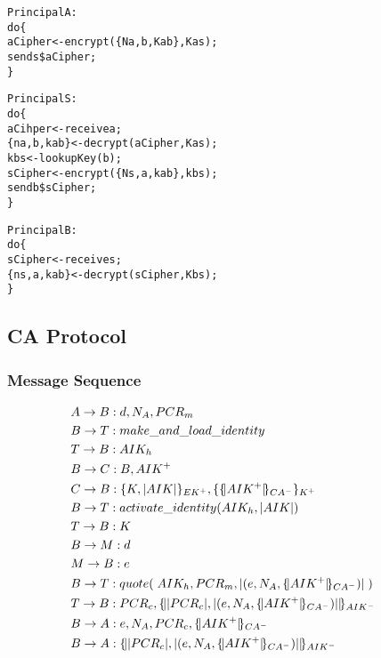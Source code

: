 \documentclass[10pt]{article}
\begin{document}
\begin{alltt}
  Principal A:
  do \{                
       aCipher <- encrypt(\{ Na, b, Kab \}, Kas);
       send s \$ aCipher;    
  \}
\end{alltt}

\begin{alltt}
  Principal S:
  do \{               
       aCihper <- receive a;
       \{ na, b, kab \} <- decrypt(aCipher, Kas);
       kbs <- lookupKey(b);   
       sCipher <- encrypt(\{ Ns, a, kab \}, kbs); 
       send b \$ sCipher;
  \}
\end{alltt}

\begin{alltt}
  Principal B:
  do \{                
       sCipher <- receive s;
       \{ ns, a, kab \} <- decrypt(sCipher, Kbs);	    
  \}
\end{alltt}

\newpage

\subsection*{CA Protocol}

\subsubsection*{Message Sequence}

\def \pmask {PCR_{m}}
\def \pcomp {PCR_{c}}
\def \evd {d}
\def \eve {e}
\def \cacert {\sign {\public{AIK}}{CA}}
\def \exdata {\hashe{(\eve, \nonce{A}, \cacert ) }}
\def \aikh {AIK_{h}}

\def \app {A}
\def \att {B}
\def \ca {C}
\def \mea {M}
\def \tp {T}

\def \req {R}
\def \resp {P}
\def \k {K}

\begin{align*}
  & \sndmsg {\app}{\att} {\evd, \nonce{\app}, \pmask}  & \\
    & \sndmsg{\att}{\tp} {make\_and\_load\_identity} & \\
      & \sndmsg{\tp}{\att} {\aikh} & \\
        & \sndmsg{\att}{\ca} {\att, \public{AIK}}  & \\
  & \sndmsg{\ca}{\att} {\encrypt{K, \hashe{AIK}}{EK}, \encrypt{\cacert}{K}} & \\
    & \sndmsg{\att}{\tp} {activate\_identity({\aikh, \hashe{AIK})}} & \\
  & \sndmsg{\tp}{\att} {K} & \\
    & \sndmsg{\att}{\mea} {\evd}  & \\
  & \sndmsg{\mea}{\att} {\eve}  & \\
  & \sndmsg{\att}{\tp} {quote(\;{AIK_{h}, \pmask, \exdata}\;)} & \\
  & \sndmsg{\tp}{\att} {\pcomp, \sign{\hashe{\pcomp}, \exdata}{AIK}}  & \\
  & \sndmsg{\att}{\app} {\eve, \nonce{\app}, \pcomp, \cacert}  & \\
  & \sndmsg{\att}{\app} {\sign{\hashe{\pcomp}, \exdata}{AIK}}  & \\  \\
\end{align*}
\end{document}

